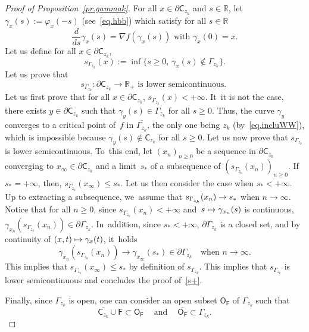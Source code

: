 \documentclass[JEP,XML,SOM,Unicode,NoEqCountersInSection,NoFloatCountersInSection,published]{cedram}
\newcommand\mto{\mathchoice{\longmapsto}{\mapsto}{\mapsto}{\mapsto}}
\newcommand{\quand}{\quad\text{and}\quad}
\let\pa\partial
\theoremstyle{plain}
\theoremstyle{definition}
\begin{document}
\begin{proof}[Proof of Proposition~\ref{pr.gammak}]
For all $x\in \pa \mathsf C_{z_k}$ and $s\in \mathbb R$, let $\gamma_x(s):=\varphi_x(-s)$ (see~\eqref{eq.hbb}) which satisfy for all $s\in \mathbb R$
\begin{equation}\label{eq.hbb2}
\frac{d}{ds}\gamma_x(s)=\nabla f(\gamma_x(s)) \text{ with } \gamma_x(0)=x.
\end{equation}
Let us define
for all $x\in \pa \mathsf C_{z_k}$,
\begin{equation}\label{eq.des+}
s_{\Gamma_{z_k}}(x):=\inf\{s\ge 0, \, \gamma_x(s) \notin {\Gamma_{z_k}} \}.
\end{equation}
Let us prove that
\begin{equation}\label{s+}
s_{\Gamma_{z_k}}: \pa \mathsf C_{z_k}\to \mathbb R_+ \text{ is lower semicontinuous. }
\end{equation}
Let us first prove that for all $x\in \pa \mathsf C_{z_k}$, $ s_{\Gamma_{z_k}}(x)<+\infty$. It~it is not the case, there exists $y\in \pa \mathsf C_{z_k}$ such that $\gamma_y(s)\in \Gamma_{z_k}$ for all $s\ge 0$. Thus, the curve $\gamma_y$ converges to a critical point of~$f$ in $\overline{\Gamma_{z_k}}$, the only one being $z_k$ (by~\eqref{eq.incluWW}), which is impossible because $\gamma_y(s)\notin \mathsf C_{z_k}$ for all $s\ge 0$. Let us now prove that $ s_{\Gamma_{z_k}}$ is lower semicontinuous. To~this end, let $(x_n)_{n\ge 0}$ be a sequence in $ \pa { \mathsf C_{z_k}}$ converging to $x_{\infty}\in \pa { \mathsf C_{z_k}}$ and a limit~$s_*$ of a subsequence of $(s_{\Gamma_{z_k}}(x_n))_{n\ge 0}$. If~$s_*=+\infty$, then, $ s_{\Gamma_{z_k}}(x_{\infty})\le s_*$. Let us then consider the case when $s_*<+\infty$. Up to extracting a subsequence, we~assume that $ s_{\Gamma_{z_k}}(x_n)\to\nobreak s_*$ when $n\to \infty$. Notice that for all $n\ge 0$, since $ s_{\Gamma_{z_k}}(x_n)<+\infty$ and~$s\mto \gamma_{x_n}(s)$ is continuous,
$\gamma_{x_n}(s_{\Gamma_{z_k}}(x_n))\in \pa \Gamma_{z_k}$. In~addition, since $s_*<+\infty$,
$\pa \Gamma_{z_k}$ is a closed set, and by continuity of $(x,t)\mto \gamma_x(t)$, it~holds
\[
\gamma_{x_n}(s_{\Gamma_{z_k}}(x_n))\to \gamma_{x_{\infty}}(s_*)\in \pa \Gamma_{z_k}\quad \text{when }n\to \infty.
\]
This implies that $ s_{\Gamma_{z_k}}(x_{\infty})\le s_*$ by definition of $ s_{\Gamma_{z_k}}$. This implies that $ s_{\Gamma_{z_k}}$ is lower semicontinuous and concludes the proof of~\eqref{s+}.

Finally, since $\Gamma_{z_k}$ is open, one can consider an open subset $\mathsf O_{\mathsf F}$ of $\Gamma_{z_k}$ such that
\[
\overline{ \mathsf C_{z_k} }\cup \mathsf F\subset \mathsf O_{\mathsf F} \ \quand \ \overline{\mathsf O_{\mathsf F}}\subset \Gamma_{z_k}.
\]

\end{proof}
\end{document}
